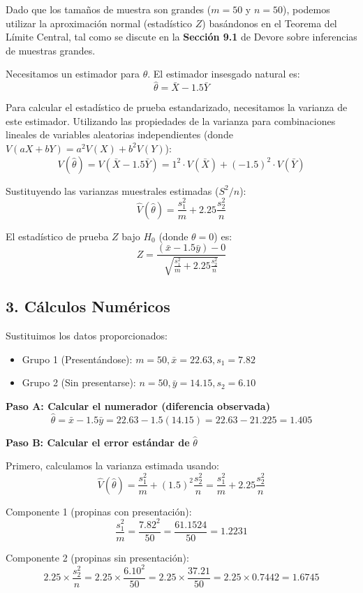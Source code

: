 \documentclass[12pt]{article}
\begin{document}
Dado que los tamaños de muestra son grandes ($m=50$ y $n=50$), podemos utilizar la aproximación normal (estadístico $Z$) basándonos en el Teorema del Límite Central, tal como se discute en la \textbf{Sección 9.1} de Devore sobre inferencias de muestras grandes.

Necesitamos un estimador para $\theta$. El estimador insesgado natural es:
$$ \hat{\theta} = \bar{X} - 1.5\bar{Y} $$

Para calcular el estadístico de prueba estandarizado, necesitamos la varianza de este estimador. Utilizando las propiedades de la varianza para combinaciones lineales de variables aleatorias independientes (donde $V(aX + bY) = a^2V(X) + b^2V(Y)$):
$$ V(\hat{\theta}) = V(\bar{X} - 1.5\bar{Y}) = 1^2 \cdot V(\bar{X}) + (-1.5)^2 \cdot V(\bar{Y}) $$

Sustituyendo las varianzas muestrales estimadas ($S^2/n$):
$$ \hat{V}(\hat{\theta}) = \frac{s_1^2}{m} + 2.25 \frac{s_2^2}{n} $$

El estadístico de prueba $Z$ bajo $H_0$ (donde $\theta = 0$) es:
$$ Z = \frac{(\bar{x} - 1.5\bar{y}) - 0}{\sqrt{\frac{s_1^2}{m} + 2.25 \frac{s_2^2}{n}}} $$

\subsection*{3. Cálculos Numéricos}

Sustituimos los datos proporcionados:
\begin{itemize}
    \item Grupo 1 (Presentándose): $m = 50, \bar{x} = 22.63, s_1 = 7.82$
    \item Grupo 2 (Sin presentarse): $n = 50, \bar{y} = 14.15, s_2 = 6.10$
\end{itemize}

\textbf{Paso A: Calcular el numerador (diferencia observada)}
$$ \hat{\theta} = \bar{x} - 1.5\bar{y} = 22.63 - 1.5(14.15) = 22.63 - 21.225 = 1.405 $$

\textbf{Paso B: Calcular el error estándar de } $\hat{\theta}$

Primero, calculamos la varianza estimada usando:
$$ \hat{V}(\hat{\theta}) = \frac{s_1^2}{m} + (1.5)^2 \frac{s_2^2}{n} = \frac{s_1^2}{m} + 2.25 \frac{s_2^2}{n} $$

Componente 1 (propinas con presentación):
$$ \frac{s_1^2}{m} = \frac{7.82^2}{50} = \frac{61.1524}{50} = 1.2231 $$

Componente 2 (propinas sin presentación):
$$ 2.25 \times \frac{s_2^2}{n} = 2.25 \times \frac{6.10^2}{50} = 2.25 \times \frac{37.21}{50} = 2.25 \times 0.7442 = 1.6745 $$
\end{document}
